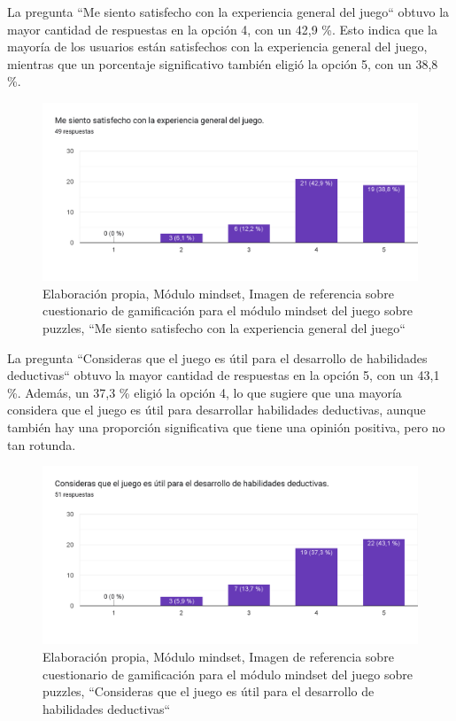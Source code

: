 La pregunta ``Me siento satisfecho con la experiencia general del juego`` obtuvo la mayor cantidad de respuestas en la opción 4, con un 42,9 \%. Esto indica que la mayoría de los usuarios están satisfechos con la experiencia general del juego, mientras que un porcentaje significativo también eligió la opción 5, con un 38,8 \%.

\begin{figure}[H]
  \centering
  \includegraphics[width=0.7\linewidth]{Imagenes/mc9.png}
  \caption{Elaboración propia, Módulo mindset, Imagen de referencia sobre cuestionario de gamificación para el módulo mindset del juego sobre puzzles, ``Me siento satisfecho con la experiencia general del juego``}
  \label{fig:cuestionario9mindset}
\end{figure}



La pregunta ``Consideras que el juego es útil para el desarrollo de habilidades deductivas`` obtuvo la mayor cantidad de respuestas en la opción 5, con un 43,1 \%. Además, un 37,3 \% eligió la opción 4, lo que sugiere que una mayoría considera que el juego es útil para desarrollar habilidades deductivas, aunque también hay una proporción significativa que tiene una opinión positiva, pero no tan rotunda.

\begin{figure}[H]
  \centering
  \includegraphics[width=0.7\linewidth]{Imagenes/mc10.png}
  \caption{Elaboración propia, Módulo mindset, Imagen de referencia sobre cuestionario de gamificación para el módulo mindset del juego sobre puzzles, ``Consideras que el juego es útil para el desarrollo de habilidades deductivas``}
  \label{fig:cuestionario10mindset}
\end{figure}

